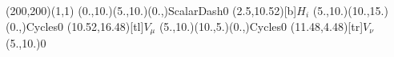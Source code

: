 \documentclass[12pt]{article}
\begin{document}
 
 \thispagestyle{empty}
	
 \begin{feynartspicture}(200,200)(1,1) 
 \FADiagram{} 
 \FAProp(0.,10.)(5.,10.)(0.,){ScalarDash}{0}
\FALabel(2.5,10.52)[b]{$H_i$}
\FAProp(5.,10.)(10.,15.)(0.,){Cycles}{0}
\FALabel(10.52,16.48)[tl]{$V_{\mu}$}
\FAProp(5.,10.)(10.,5.)(0.,){Cycles}{0}
\FALabel(11.48,4.48)[tr]{$V_{\nu}$}
\FAVert(5.,10.){0}
 
	
 
 \end{feynartspicture} 
 
\end{document}
